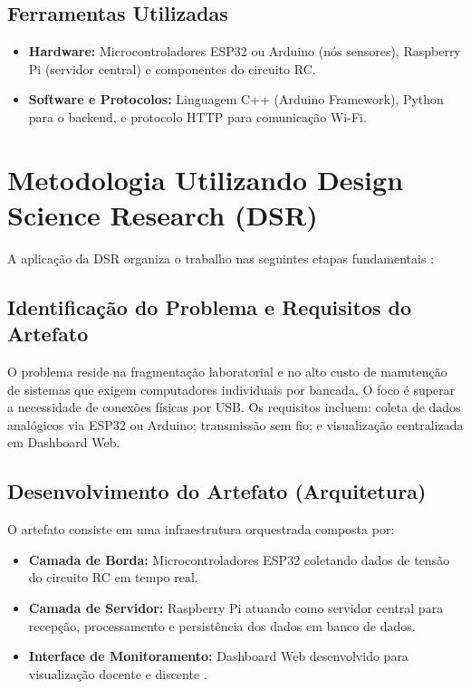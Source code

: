 \subsection{Ferramentas Utilizadas}  
\begin{itemize}
    \item \textbf{Hardware:} Microcontroladores ESP32 ou Arduino (nós sensores), Raspberry Pi (servidor central) e componentes do circuito RC.
    \item \textbf{Software e Protocolos:} Linguagem C++ (Arduino Framework), Python para o backend, e protocolo HTTP para comunicação Wi-Fi.
\end{itemize}

\section{Metodologia Utilizando Design Science Research (DSR)}

A aplicação da DSR organiza o trabalho nas seguintes etapas fundamentais \cite{hevner}:

\subsection{Identificação do Problema e Requisitos do Artefato}
O problema reside na fragmentação laboratorial e no alto custo de manutenção de sistemas que exigem computadores individuais por bancada. O foco é superar a necessidade de conexões físicas por USB. Os requisitos incluem: coleta de dados analógicos via ESP32 ou Arduino; transmissão sem fio; e visualização centralizada em Dashboard Web.

\subsection{Desenvolvimento do Artefato (Arquitetura)}
O artefato consiste em uma infraestrutura orquestrada composta por:
\begin{itemize}
	\item \textbf{Camada de Borda:} Microcontroladores ESP32 coletando dados de tensão do circuito RC em tempo real.
	\item \textbf{Camada de Servidor:} Raspberry Pi atuando como servidor central para recepção, processamento e persistência dos dados em banco de dados.
	\item \textbf{Interface de Monitoramento:} Dashboard Web desenvolvido para visualização docente e discente \cite{silva}.
\end{itemize}

